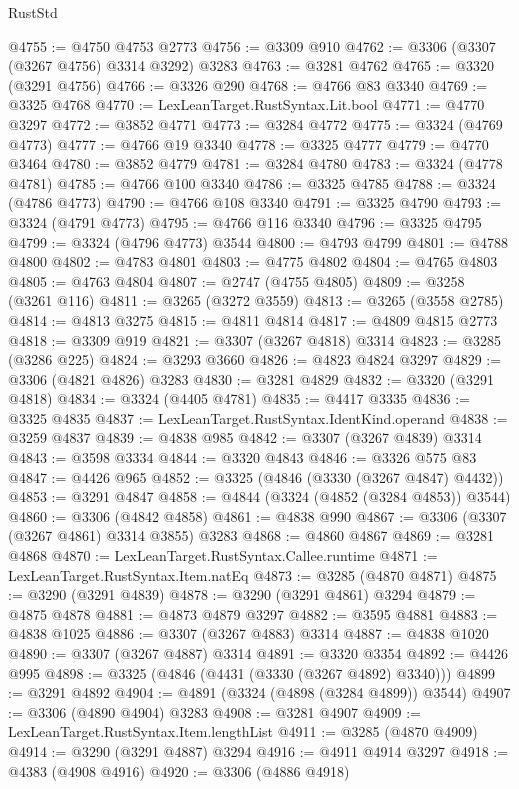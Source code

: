 \begin{lexlean}{RustStd}
\begin{coremodule}
@4755 := @4750 @4753 @2773
@4756 := @3309 @910
@4762 := @3306 (@3307 (@3267 @4756) @3314 @3292) @3283
@4763 := @3281 @4762
@4765 := @3320 (@3291 @4756)
@4766 := @3326 @290
@4768 := @4766 @83 @3340
@4769 := @3325 @4768
@4770 := LexLeanTarget.RustSyntax.Lit.bool
@4771 := @4770 @3297
@4772 := @3852 @4771
@4773 := @3284 @4772
@4775 := @3324 (@4769 @4773)
@4777 := @4766 @19 @3340
@4778 := @3325 @4777
@4779 := @4770 @3464
@4780 := @3852 @4779
@4781 := @3284 @4780
@4783 := @3324 (@4778 @4781)
@4785 := @4766 @100 @3340
@4786 := @3325 @4785
@4788 := @3324 (@4786 @4773)
@4790 := @4766 @108 @3340
@4791 := @3325 @4790
@4793 := @3324 (@4791 @4773)
@4795 := @4766 @116 @3340
@4796 := @3325 @4795
@4799 := @3324 (@4796 @4773) @3544
@4800 := @4793 @4799
@4801 := @4788 @4800
@4802 := @4783 @4801
@4803 := @4775 @4802
@4804 := @4765 @4803
@4805 := @4763 @4804
@4807 := @2747 (@4755 @4805)
@4809 := @3258 (@3261 @116)
@4811 := @3265 (@3272 @3559)
@4813 := @3265 (@3558 @2785)
@4814 := @4813 @3275
@4815 := @4811 @4814
@4817 := @4809 @4815 @2773
@4818 := @3309 @919
@4821 := @3307 (@3267 @4818) @3314
@4823 := @3285 (@3286 @225)
@4824 := @3293 @3660
@4826 := @4823 @4824 @3297
@4829 := @3306 (@4821 @4826) @3283
@4830 := @3281 @4829
@4832 := @3320 (@3291 @4818)
@4834 := @3324 (@4405 @4781)
@4835 := @4417 @3335
@4836 := @3325 @4835
@4837 := LexLeanTarget.RustSyntax.IdentKind.operand
@4838 := @3259 @4837
@4839 := @4838 @985
@4842 := @3307 (@3267 @4839) @3314
@4843 := @3598 @3334
@4844 := @3320 @4843
@4846 := @3326 @575 @83
@4847 := @4426 @965
@4852 := @3325 (@4846 (@3330 (@3267 @4847) @4432))
@4853 := @3291 @4847
@4858 := @4844 (@3324 (@4852 (@3284 @4853)) @3544)
@4860 := @3306 (@4842 @4858)
@4861 := @4838 @990
@4867 := @3306 (@3307 (@3267 @4861) @3314 @3855) @3283
@4868 := @4860 @4867
@4869 := @3281 @4868
@4870 := LexLeanTarget.RustSyntax.Callee.runtime
@4871 := LexLeanTarget.RustSyntax.Item.natEq
@4873 := @3285 (@4870 @4871)
@4875 := @3290 (@3291 @4839)
@4878 := @3290 (@3291 @4861) @3294
@4879 := @4875 @4878
@4881 := @4873 @4879 @3297
@4882 := @3595 @4881
@4883 := @4838 @1025
@4886 := @3307 (@3267 @4883) @3314
@4887 := @4838 @1020
@4890 := @3307 (@3267 @4887) @3314
@4891 := @3320 @3354
@4892 := @4426 @995
@4898 := @3325 (@4846 (@4431 (@3330 (@3267 @4892) @3340)))
@4899 := @3291 @4892
@4904 := @4891 (@3324 (@4898 (@3284 @4899)) @3544)
@4907 := @3306 (@4890 @4904) @3283
@4908 := @3281 @4907
@4909 := LexLeanTarget.RustSyntax.Item.lengthList
@4911 := @3285 (@4870 @4909)
@4914 := @3290 (@3291 @4887) @3294
@4916 := @4911 @4914 @3297
@4918 := @4383 (@4908 @4916)
@4920 := @3306 (@4886 @4918)

\end{coremodule}
\end{lexlean}
